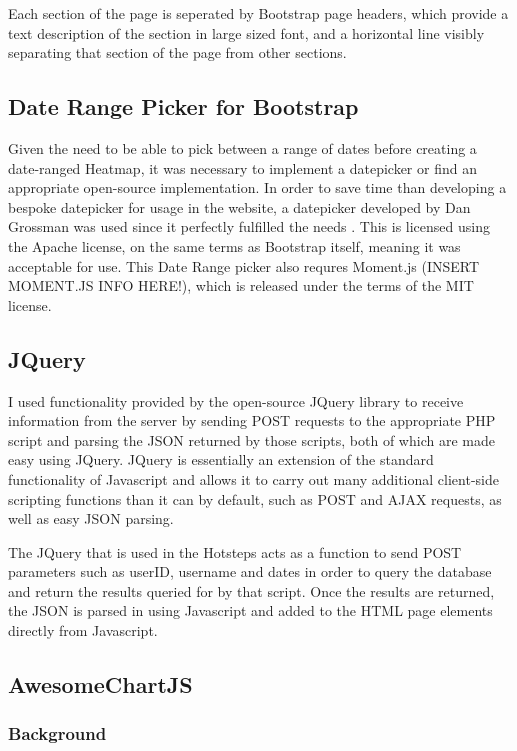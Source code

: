 \documentclass{l4proj}
\begin{document}
Each section of the page is seperated by Bootstrap page headers, which provide a text description of the section in large sized font, and a horizontal line visibly separating that section of the page from other sections.

\subsection{Date Range Picker for Bootstrap}

Given the need to be able to pick between a range of dates before creating a date-ranged Heatmap, it was necessary to implement a datepicker or find an appropriate open-source implementation. In order to save time than developing a bespoke datepicker for usage in the website, a datepicker developed by Dan Grossman was used since it perfectly fulfilled the needs . This is licensed using the Apache license, on the same terms as Bootstrap itself, meaning it was acceptable for use. This Date Range picker also requres Moment.js (INSERT MOMENT.JS INFO HERE!), which is released under the terms of the MIT license. 

\subsection{JQuery}

I used functionality provided by the open-source JQuery library to receive information from the server by sending POST requests to the appropriate PHP script and parsing the JSON returned by those scripts, both of which are made easy using JQuery. JQuery is essentially an extension of the standard functionality of Javascript and allows it to carry out many additional client-side scripting functions than it can by default, such as POST and AJAX requests, as well as easy JSON parsing.

The JQuery that is used in the Hotsteps acts as a function to send POST parameters such as userID, username and dates in order to query the database and return the results queried for by that script. Once the results are returned, the JSON is parsed in using Javascript and added to the HTML page elements directly from Javascript.

\subsection{AwesomeChartJS}

\subsubsection{Background}
\end{document}
